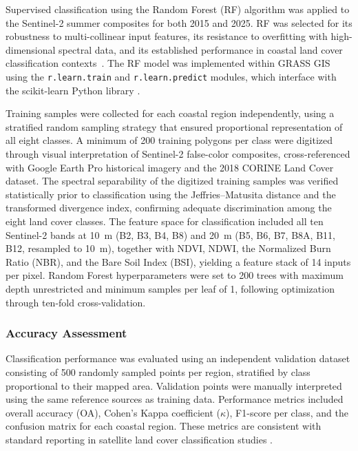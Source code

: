 \documentclass[coasts,article,accept,pdftex,moreauthors]{Definitions/mdpi}
\begin{document}
Supervised classification using the Random Forest (RF) algorithm was applied to the Sentinel-2 summer composites for both 2015 and 2025. RF was selected for its robustness to multi-collinear input features, its resistance to overfitting with high-dimensional spectral data, and its established performance in coastal land cover classification contexts~\citep{VegPortugal2022}. The RF model was implemented within GRASS GIS using the \texttt{r.learn.train} and \texttt{r.learn.predict} modules, which interface with the scikit-learn Python library \citep{Lemenkova2023ML}.

Training samples were collected for each coastal region independently, using a stratified random sampling strategy that ensured proportional representation of all eight classes. A minimum of 200 training polygons per class were digitized through visual interpretation of Sentinel-2 false-color composites, cross-referenced with Google Earth Pro historical imagery and the 2018 CORINE Land Cover dataset. {The spectral separability of the digitized training samples was verified statistically prior to classification using the Jeffries--Matusita distance and the transformed divergence index, confirming adequate discrimination among the eight land cover classes.} The feature space for classification included all ten Sentinel-2 bands at 10~m (B2, B3, B4, B8) and 20~m (B5, B6, B7, B8A, B11, B12, resampled to 10~m), together with NDVI, NDWI, the Normalized Burn Ratio (NBR), and the Bare Soil Index (BSI), yielding a feature stack of 14 inputs per pixel. Random Forest hyperparameters were set to 200 trees with maximum depth unrestricted and minimum samples per leaf of 1, following optimization through ten-fold cross-validation.

\subsubsection{Accuracy Assessment}
\label{sec:accuracy}

Classification performance was evaluated using an independent validation dataset consisting of 500 randomly sampled points per region, stratified by class proportional to their mapped area. Validation points were manually interpreted using the same reference sources as training data. Performance metrics included overall accuracy (OA), Cohen's Kappa coefficient ($\kappa$), F1-score per class, and the confusion matrix for each coastal region. These metrics are consistent with standard reporting in satellite land cover classification studies \citep{Lemenkova202505}.
\end{document}
